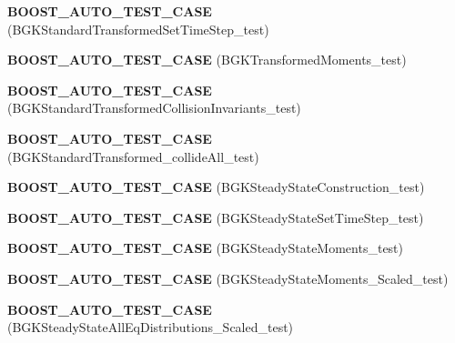 \begin{DoxyCompactItemize}
\item 
\hypertarget{namespacenatrium_ad1fb291bc5533411170ccd76077536c3}{
{\bfseries BOOST\_\-AUTO\_\-TEST\_\-CASE} (BGKStandardTransformedSetTimeStep\_\-test)}
\label{namespacenatrium_ad1fb291bc5533411170ccd76077536c3}

\item 
\hypertarget{namespacenatrium_a77bbfe0e7ee61933f94814e328fb4f33}{
{\bfseries BOOST\_\-AUTO\_\-TEST\_\-CASE} (BGKTransformedMoments\_\-test)}
\label{namespacenatrium_a77bbfe0e7ee61933f94814e328fb4f33}

\item 
\hypertarget{namespacenatrium_a0dc2bf09abe47dd26f2f57f2c57bcdf2}{
{\bfseries BOOST\_\-AUTO\_\-TEST\_\-CASE} (BGKStandardTransformedCollisionInvariants\_\-test)}
\label{namespacenatrium_a0dc2bf09abe47dd26f2f57f2c57bcdf2}

\item 
\hypertarget{namespacenatrium_a290363fe04219a9ab8157ff7182021f0}{
{\bfseries BOOST\_\-AUTO\_\-TEST\_\-CASE} (BGKStandardTransformed\_\-collideAll\_\-test)}
\label{namespacenatrium_a290363fe04219a9ab8157ff7182021f0}

\item 
\hypertarget{namespacenatrium_a1102ad6934f491e6a49480081982440a}{
{\bfseries BOOST\_\-AUTO\_\-TEST\_\-CASE} (BGKSteadyStateConstruction\_\-test)}
\label{namespacenatrium_a1102ad6934f491e6a49480081982440a}

\item 
\hypertarget{namespacenatrium_a0040d9381f0717dfa1faccf4995a4f85}{
{\bfseries BOOST\_\-AUTO\_\-TEST\_\-CASE} (BGKSteadyStateSetTimeStep\_\-test)}
\label{namespacenatrium_a0040d9381f0717dfa1faccf4995a4f85}

\item 
\hypertarget{namespacenatrium_a61d21f636a84d5adb7912b847b25fa06}{
{\bfseries BOOST\_\-AUTO\_\-TEST\_\-CASE} (BGKSteadyStateMoments\_\-test)}
\label{namespacenatrium_a61d21f636a84d5adb7912b847b25fa06}

\item 
\hypertarget{namespacenatrium_a10f79d9f3fff4b4bd1a74f9cecbec22a}{
{\bfseries BOOST\_\-AUTO\_\-TEST\_\-CASE} (BGKSteadyStateMoments\_\-Scaled\_\-test)}
\label{namespacenatrium_a10f79d9f3fff4b4bd1a74f9cecbec22a}

\item 
\hypertarget{namespacenatrium_abc1880f32a200d413949cb5ac59d94b1}{
{\bfseries BOOST\_\-AUTO\_\-TEST\_\-CASE} (BGKSteadyStateAllEqDistributions\_\-Scaled\_\-test)}
\label{namespacenatrium_abc1880f32a200d413949cb5ac59d94b1}


\end{DoxyCompactItemize}
